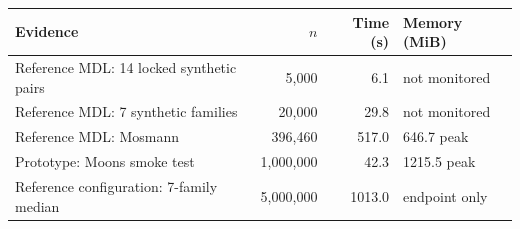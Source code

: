 \begin{tabular}{@{}lrrl@{}}
\toprule
Evidence & $n$ & Time (s) & Memory (MiB) \\
\midrule
Reference MDL: 14 locked synthetic pairs & 5,000 & 6.1 & not monitored \\
Reference MDL: 7 synthetic families & 20,000 & 29.8 & not monitored \\
Reference MDL: Mosmann & 396,460 & 517.0 & 646.7 peak \\
Prototype: Moons smoke test & 1,000,000 & 42.3 & 1215.5 peak \\
Reference configuration: 7-family median & 5,000,000 & 1013.0 & endpoint only \\
\bottomrule
\end{tabular}
